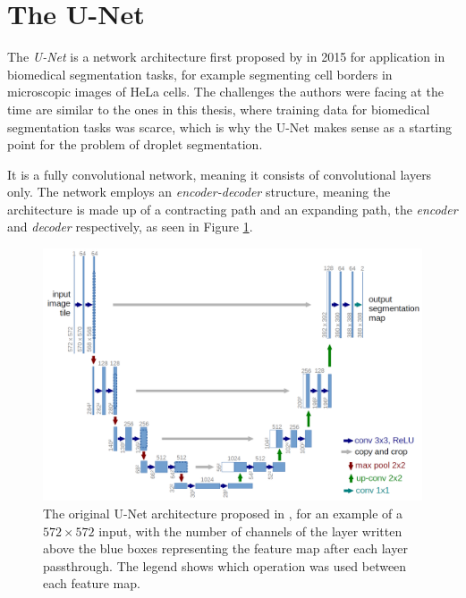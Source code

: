 \section{The U-Net}

The \emph{U-Net} is a network architecture first proposed by \cite{ronnebergerUNetConvolutionalNetworks2015} in 2015 for application in biomedical segmentation tasks, for example segmenting cell borders in microscopic images of HeLa cells. 
The challenges the authors were facing at the time are similar to the ones in this thesis, where training data for biomedical segmentation tasks was scarce, which is why the U-Net makes sense as a starting point for the problem of droplet segmentation.

It is a fully convolutional network, meaning it consists of convolutional layers only.
The network employs an \emph{encoder-decoder} structure, meaning the architecture is made up of a contracting path and an expanding path, the \emph{encoder} and \emph{decoder} respectively, as seen in Figure \ref{fig:unet}.

\begin{figure}[htbp]
    \includegraphics[width=\textwidth]{images/unet.png}
    \caption{The original U-Net architecture proposed in \cite{ronnebergerUNetConvolutionalNetworks2015}, for an example of a $572\times 572$ input, with the number of channels of the layer written above the blue boxes representing the feature map after each layer passthrough. The legend shows which operation was used between each feature map. \cite{ronnebergerUNetConvolutionalNetworks2015}}
    \label{fig:unet}
\end{figure}

